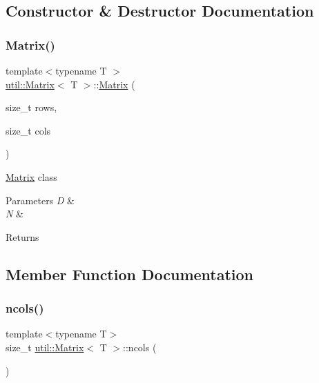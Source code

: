\subsection{Constructor \& Destructor Documentation}
\mbox{\label{classutil_1_1Matrix_aa68ae4682b48d4f40bc2a3ef0ed75976}} 
\subsubsection{\texorpdfstring{Matrix()}{Matrix()}}
{\footnotesize\ttfamily template$<$typename T $>$ \\
\hyperlink{classutil_1_1Matrix}{util\+::\+Matrix}$<$ T $>$\+::\hyperlink{classutil_1_1Matrix}{Matrix} (\begin{DoxyParamCaption}\item[{size\+\_\+t}]{rows,  }\item[{size\+\_\+t}]{cols }\end{DoxyParamCaption})}

\hyperlink{classutil_1_1Matrix}{Matrix} class


\begin{DoxyParams}{Parameters}
{\em D} & \\
\hline
{\em N} & \\
\hline
\end{DoxyParams}
\begin{DoxyReturn}{Returns}

\end{DoxyReturn}


\subsection{Member Function Documentation}
\mbox{\label{classutil_1_1Matrix_a728bc44831ab516e0a46c1c342e8b996}} 
\subsubsection{\texorpdfstring{ncols()}{ncols()}}
{\footnotesize\ttfamily template$<$typename T$>$ \\
size\+\_\+t \hyperlink{classutil_1_1Matrix}{util\+::\+Matrix}$<$ T $>$\+::ncols (\begin{DoxyParamCaption}{ }\end{DoxyParamCaption})}

